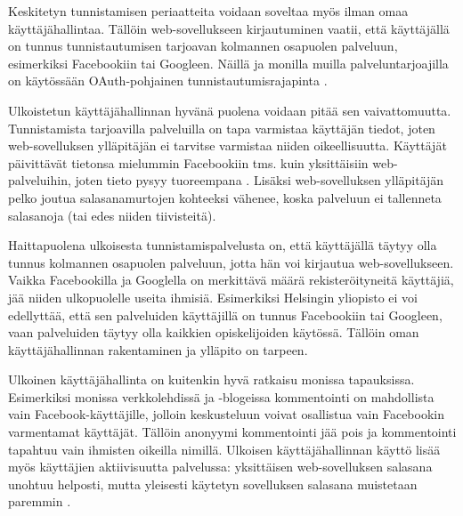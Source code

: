 Keskitetyn tunnistamisen periaatteita voidaan soveltaa myös ilman omaa käyttäjähallintaa. Tällöin web-sovellukseen kirjautuminen vaatii, että käyttäjällä on tunnus tunnistautumisen tarjoavan kolmannen osapuolen palveluun, esimerkiksi Facebookiin tai Googleen. Näillä ja monilla muilla palveluntarjoajilla on käytössään OAuth-pohjainen tunnistautumisrajapinta \cite{inside_the_identity_management_game}.

Ulkoistetun käyttäjähallinnan hyvänä puolena voidaan pitää sen vaivattomuutta. Tunnistamista tarjoavilla palveluilla on tapa varmistaa käyttäjän tiedot, joten web-sovelluksen ylläpitäjän ei tarvitse varmistaa niiden oikeellisuutta. Käyttäjät päivittävät tietonsa mielummin Facebookiin tms. kuin yksittäisiin web-palveluihin, joten tieto pysyy tuoreempana \cite{inside_the_identity_management_game}. Lisäksi web-sovelluksen ylläpitäjän pelko joutua salasanamurtojen kohteeksi vähenee, koska palveluun ei tallenneta salasanoja (tai edes niiden tiivisteitä).

Haittapuolena ulkoisesta tunnistamispalvelusta on, että käyttäjällä täytyy olla tunnus kolmannen osapuolen palveluun, jotta hän voi kirjautua web-sovellukseen. Vaikka Facebookilla ja Googlella on merkittävä määrä rekisteröityneitä käyttäjiä, jää niiden ulkopuolelle useita ihmisiä. Esimerkiksi Helsingin yliopisto ei voi edellyttää, että sen palveluiden käyttäjillä on tunnus Facebookiin tai Googleen, vaan palveluiden täytyy olla kaikkien opiskelijoiden käytössä. Tällöin oman käyttäjähallinnan rakentaminen ja ylläpito on tarpeen.

Ulkoinen käyttäjähallinta on kuitenkin hyvä ratkaisu monissa tapauksissa. Esimerkiksi monissa verkkolehdissä ja -blogeissa kommentointi on mahdollista vain Fa\-ce\-book-käyt\-tä\-jil\-le, jolloin keskusteluun voivat osallistua vain Facebookin varmentamat käyttäjät. Tällöin anonyymi kommentointi jää pois ja kommentointi tapahtuu vain ihmisten oikeilla nimillä. Ulkoisen käyttäjähallinnan käyttö lisää myös käyttäjien aktiivisuutta palvelussa: yksittäisen web-sovelluksen salasana unohtuu helposti, mutta yleisesti käytetyn sovelluksen salasana muistetaan paremmin \cite{password_habits}.